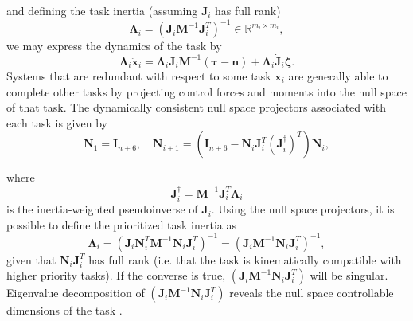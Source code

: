 \documentclass[../main.tex]{subfiles}
\begin{document}
and defining the task inertia (assuming $\bm{J}_i$ has full rank)
\begin{equation}
    \label{eq:task_inertia}
    \bm{\Lambda}_i = (\bm{J}_i\bm{M}^{-1}\bm{J}_i^T)^{-1} \in \mathbb{R}^{m_i \times m_i},
\end{equation}
we may express the dynamics of the task by
\begin{equation}
    \label{eq:task_dynamics}
    \bm{\Lambda}_i\ddot{\bm{x}}_i =
    \bm{\Lambda}_i\bm{J}_i \bm{M}^{-1}( \bm{\tau}
    - \bm{n}) + \bm{\Lambda}_i\dot{\bm{J}}_i \bm{\zeta}.
\end{equation}
Systems that are redundant with respect to some task $\bm{x}_i$ are generally able to complete other tasks by projecting control forces and moments into the null space of that task. The dynamically consistent null space projectors associated with each task is given by \citep{Khatib2004}
\begin{equation}
    \label{eq:nullspace_projector}
    \bm{N}_1 = \bm{I}_{n+6}, \quad
        \bm{N}_{i+1} = \left(\bm{I}_{n+6} - \bm{N}_i\bm{J}^T_i (\bm{J}^{\dagger}_i)^T\right)\bm{N}_i,
\end{equation}

where
\begin{equation}
    \label{eq:J_inv}
    \bm{J}_i^{\dagger} = \bm{M}^{-1}\bm{J}_i^T\bm{\Lambda}_i
\end{equation}
is the inertia-weighted pseudoinverse of $\bm{J}_i$. Using the null space projectors, it is possible to define the prioritized task inertia \citep{Khatib2004} as
\begin{equation}
    \label{eq:prioritized task inertia}
    \bm{\Lambda}_i = (\bm{J}_i\bm{N}_i^T\bm{M}^{-1}\bm{N}_i\bm{J}_i^T)^{-1} = (\bm{J}_i\bm{M}^{-1}\bm{N}_i\bm{J}_i^T)^{-1},
\end{equation}
given that $\bm{N}_i\bm{J}_i^T$ has full rank (i.e. that the task is kinematically compatible with higher priority tasks). If the converse is true, $(\bm{J}_i\bm{M}^{-1}\bm{N}_i\bm{J}_i^T)$ will be singular. Eigenvalue decomposition of $(\bm{J}_i\bm{M}^{-1}\bm{N}_i\bm{J}_i^T)$ reveals the null space controllable dimensions of the task \citep{Khatib2004}.
\end{document}
